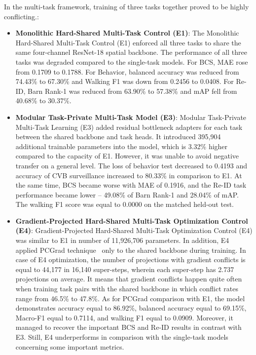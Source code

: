 In the multi-task framework, training of three tasks together proved to be highly conflicting.:
\begin{itemize}
    \item \textbf{Monolithic Hard-Shared Multi-Task Control (E1)}: The Monolithic Hard-Shared Multi-Task Control (E1) enforced all three tasks to share the same four-channel ResNet-18 spatial backbone. The performance of all three tasks was degraded compared to the single-task models. For BCS, MAE rose from 0.1709 to 0.1788. For Behavior, balanced accuracy was reduced from 74.43\% to 67.30\% and Walking F1 was down from 0.2456 to 0.0408. For Re-ID, Barn Rank-1 was reduced from 63.90\% to 57.38\% and mAP fell from 40.68\% to 30.37\%.
    \item \textbf{Modular Task-Private Multi-Task Model (E3)}: Modular Task-Private Multi-Task Learning (E3) added residual bottleneck adapters for each task between the shared backbone and task heads. It introduced 395,904 additional trainable parameters into the model, which is 3.32\% higher compared to the capacity of E1. However, it was unable to avoid negative transfer on a general level. The loss of behavior test decreased to 0.4193 and accuracy of CVB surveillance increased to 80.33\% in comparison to E1. At the same time, BCS became worse with MAE of 0.1916, and the Re-ID task performance became lower -- 49.08\% of Barn Rank-1 and 28.04\% of mAP. The walking F1 score was equal to 0.0000 on the matched held-out test.
    \item \textbf{Gradient-Projected Hard-Shared Multi-Task Optimization Control (E4)}: Gradient-Projected Hard-Shared Multi-Task Optimization Control (E4) was similar to E1 in number of 11,926,706 parameters. In addition, E4 applied PCGrad technique~\cite{yu2020pcgrad} only to the shared backbone during training. In case of E4 optimization, the number of projections with gradient conflicts is equal to 44,177 in 16,140 super-steps, wherein each super-step has 2.737 projections on average. It means that gradient conflicts happen quite often when training task pairs with the shared backbone in which conflict rates range from 46.5\% to 47.8\%. As for PCGrad comparison with E1, the model demonstrates accuracy equal to 86.92\%, balanced accuracy equal to 69.15\%, Macro-F1 equal to 0.7114, and walking F1 equal to 0.0909. Moreover, it managed to recover the important BCS and Re-ID results in contrast with E3. Still, E4 underperforms in comparison with the single-task models concerning some important metrics.
\end{itemize}


